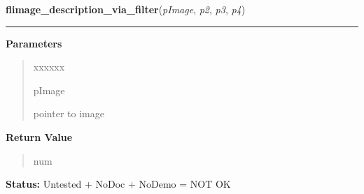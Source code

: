 \hspace{.8\funcindent}\begin{boxedminipage}{\funcwidth}

    \raggedright \textbf{flimage\_description\_via\_filter}(\textit{pImage}, \textit{p2}, \textit{p3}, \textit{p4})

    \vspace{-1.5ex}

    \rule{\textwidth}{0.5\fboxrule}
\setlength{\parskip}{2ex}
\setlength{\parskip}{1ex}
      \textbf{Parameters}
      \vspace{-1ex}

      \begin{quote}
        \begin{Ventry}{xxxxxx}

          \item[pImage]

          pointer to image

        \end{Ventry}

      \end{quote}

      \textbf{Return Value}
    \vspace{-1ex}

      \begin{quote}
      num

      \end{quote}

\textbf{Status:} Untested + NoDoc + NoDemo = NOT OK



    \end{boxedminipage}

    \label{xformslib:library:flimage_write_via_filter}

    \vspace{0.5ex}

